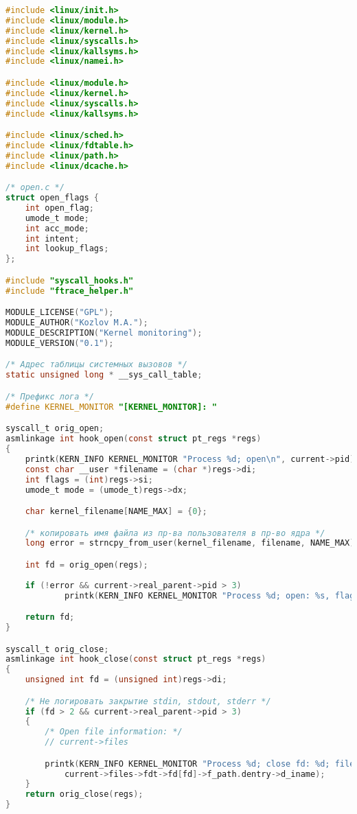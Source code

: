 \begin{lstlisting}[language=C, label=lst:kernel_monitor_c, caption=kernel\_monitor.c.]
#include <linux/init.h>
#include <linux/module.h>
#include <linux/kernel.h>
#include <linux/syscalls.h>
#include <linux/kallsyms.h>
#include <linux/namei.h>

#include <linux/module.h>
#include <linux/kernel.h>
#include <linux/syscalls.h>
#include <linux/kallsyms.h>

#include <linux/sched.h>
#include <linux/fdtable.h>
#include <linux/path.h>
#include <linux/dcache.h>

/* open.c */
struct open_flags {
    int open_flag;
    umode_t mode;
    int acc_mode;
    int intent;
    int lookup_flags;
};

#include "syscall_hooks.h"
#include "ftrace_helper.h"

MODULE_LICENSE("GPL");
MODULE_AUTHOR("Kozlov M.A.");
MODULE_DESCRIPTION("Kernel monitoring");
MODULE_VERSION("0.1");

/* Адрес таблицы системных вызовов */
static unsigned long * __sys_call_table;

/* Префикс лога */
#define KERNEL_MONITOR "[KERNEL_MONITOR]: "

syscall_t orig_open;
asmlinkage int hook_open(const struct pt_regs *regs)
{
    printk(KERN_INFO KERNEL_MONITOR "Process %d; open\n", current->pid);
    const char __user *filename = (char *)regs->di;
    int flags = (int)regs->si;
    umode_t mode = (umode_t)regs->dx;

    char kernel_filename[NAME_MAX] = {0};

    /* копировать имя файла из пр-ва пользователя в пр-во ядра */
    long error = strncpy_from_user(kernel_filename, filename, NAME_MAX);

    int fd = orig_open(regs);
        
    if (!error && current->real_parent->pid > 3)
            printk(KERN_INFO KERNEL_MONITOR "Process %d; open: %s, flags: %x; mode: %x; fd: %d\n", current->pid, kernel_filename, flags, mode, fd);

    return fd;
}

syscall_t orig_close;
asmlinkage int hook_close(const struct pt_regs *regs)
{
    unsigned int fd = (unsigned int)regs->di;

    /* Не логировать закрытие stdin, stdout, stderr */
    if (fd > 2 && current->real_parent->pid > 3)
    {
        /* Open file information: */
        // current->files

        printk(KERN_INFO KERNEL_MONITOR "Process %d; close fd: %d; filename: %s\n", current->pid, fd, 
            current->files->fdt->fd[fd]->f_path.dentry->d_iname);
    }
    return orig_close(regs);
}


\end{lstlisting}
